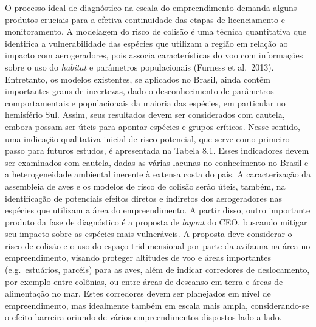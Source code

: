 \documentclass[
  oneside]{scrbook}
\begin{document}
O processo ideal de diagnóstico na escala do empreendimento demanda alguns produtos cruciais para a efetiva continuidade das etapas de licenciamento e monitoramento. A modelagem do risco de colisão é uma técnica quantitativa que identifica a vulnerabilidade das espécies que utilizam a região em relação ao impacto com aerogeradores, pois associa características do voo com informações sobre o uso do \emph{habitat} e parâmetros populacionais (Furness et al.~2013). Entretanto, os modelos existentes, se aplicados no Brasil, ainda contêm importantes graus de incertezas, dado o desconhecimento de parâmetros comportamentais e populacionais da maioria das espécies, em particular no hemisfério Sul. Assim, seus resultados devem ser considerados com cautela, embora possam ser úteis para apontar espécies e grupos críticos. Nesse sentido, uma indicação qualitativa inicial de risco potencial, que serve como primeiro passo para futuros estudos, é apresentada na Tabela 8.1. Esses indicadores devem ser examinados com cautela, dadas as várias lacunas no conhecimento no Brasil e a heterogeneidade ambiental inerente à extensa costa do país. A caracterização da assembleia de aves e os modelos de risco de colisão serão úteis, também, na identificação de potenciais efeitos diretos e indiretos dos aerogeradores nas espécies que utilizam a área do empreendimento. A partir disso, outro importante produto da fase de diagnóstico é a proposta de \emph{layout} do CEO, buscando mitigar seu impacto sobre as espécies mais vulneráveis. A proposta deve considerar o risco de colisão e o uso do espaço tridimensional por parte da avifauna na área no empreendimento, visando proteger altitudes de voo e áreas importantes (e.g.~estuários, parcéis) para as aves, além de indicar corredores de deslocamento, por exemplo entre colônias, ou entre áreas de descanso em terra e áreas de alimentação no mar. Estes corredores devem ser planejados em nível de empreendimento, mas idealmente também em escala mais ampla, considerando-se o efeito barreira oriundo de vários empreendimentos dispostos lado a lado.
\end{document}
